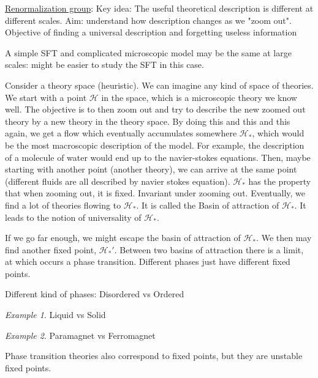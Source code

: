 \documentclass[a4paper]{book}
\theoremstyle{definition}
\theoremstyle{remark}
\newtheorem*{example}{Example}
\begin{document}
\underline{Renormalization group}: \newline 
Key idea: The useful theoretical description is different at different scales. \newline 
Aim: understand how description changes as we "zoom out".\newline 
Objective of finding a universal description and forgetting useless information\par \medskip 

A simple SFT and complicated microscopic model may be the same at large scales: might be easier to study the SFT in this case. \bigskip

Consider a theory space (heuristic). We can imagine any kind of space of theories. We start with a point $\mathcal{H}$ in the space, which is a microscopic theory we know well. The objective is to then  zoom out and try to describe the new zoomed out theory by a new theory in the theory space. By doing this and this and this again, we get a flow which eventually accumulates somewhere $\mathcal{H}_*$, which would be the most macroscopic description of the model. For example, the description of a molecule of water would end up to the navier-stokes equations. Then, maybe starting with another point (another theory), we can arrive at the same point (different fluids are all described by navier stokes equation). $\mathcal{H}_*$ has the property that when zooming out, it is fixed. Invariant under zooming out. Eventually, we find a lot of theories flowing to  $\mathcal{H}_*$. It is called the Basin of attraction of  $\mathcal{H}_*$. It leads to the notion of universality of  $\mathcal{H}_*$. \par 

If we go far enough, we might escape the basin of attraction of  $\mathcal{H}_*$. We then may find another fixed point,  $\mathcal{H}_*'$. Between two basins of attraction there is a limit, at which occurs a phase transition. Different phases just have different fixed points. \par \bigskip 

Different kind of phases: \newline 
Disordered vs Ordered
\begin{example}
    Liquid vs Solid
\end{example}
\begin{example}
    Paramagnet vs Ferromagnet
\end{example}\medskip 

Phase transition theories also correspond to fixed points, but they are unstable fixed points. \par 
\end{document}
